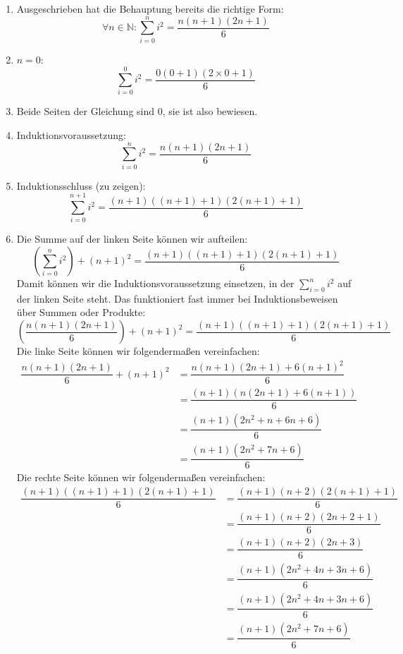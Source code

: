 \begin{enumerate}
\item Ausgeschrieben hat die Behauptung bereits die richtige Form:
\begin{displaymath}
  \forall n\in\mathbb{N}: \sum_{i=0}^n i^2 = \dfrac{n(n+1)(2n+1)}{6}
\end{displaymath}
\item $n=0$:
\begin{displaymath}
  \sum_{i=0}^0 i^2 = \dfrac{0(0+1)(2\times 0 + 1)}{6}
\end{displaymath}
\item Beide Seiten der Gleichung sind $0$, sie ist also bewiesen.
\item Induktionsvoraussetzung:
%
\begin{displaymath}
  \sum_{i=0}^n i^2 = \dfrac{n(n+1)(2n+1)}{6}
\end{displaymath}
\item Induktionsschluss (zu zeigen):
\begin{displaymath}
  \sum_{i=0}^{n+1} i^2 = \dfrac{(n+1)((n+1)+1)(2(n+1)+1)}{6}
\end{displaymath}
\item Die Summe auf der linken Seite können wir aufteilen:
%
\begin{displaymath}
  (\sum_{i=0}^{n} i^2) + (n+1)^2  = \dfrac{(n+1)((n+1)+1)(2(n+1)+1)}{6}
\end{displaymath}
%
Damit können wir die Induktionsvoraussetzung einsetzen, in der
$\sum_{i=0}^{n} i^2$ auf der linken Seite steht.  Das
funktioniert fast immer bei Induktionsbeweisen über
Summen oder Produkte:
%
\begin{displaymath}
  (\dfrac{n(n+1)(2n+1)}{6}) + (n+1)^2  =
  \dfrac{(n+1)((n+1)+1)(2(n+1)+1)}{6}
\end{displaymath}
%
Die linke Seite können wir folgendermaßen vereinfachen:
%
\begin{displaymath}
\begin{split}
  \dfrac{n(n+1)(2n+1)}{6} + (n+1)^2  &=
  \dfrac{n(n+1)(2n+1) + 6(n+1)^2}{6} \\ &=
  \dfrac{(n+1)(n(2n+1) + 6(n+1))}{6} \\ &=
  \dfrac{(n+1)(2n^2+n + 6n+6)}{6} \\ &=
  \dfrac{(n+1)(2n^2+  7n+6)}{6}
\end{split}
\end{displaymath}
%
Die rechte Seite können wir folgendermaßen vereinfachen:
%
\begin{displaymath}
  \begin{split}
  \dfrac{(n+1)((n+1)+1)(2(n+1)+1)}{6} &=
  \dfrac{(n+1)(n+2)(2(n+1)+1)}{6} \\ &=
  \dfrac{(n+1)(n+2)(2n+2+1)}{6} \\ &=
  \dfrac{(n+1)(n+2)(2n+3)}{6} \\ &=
  \dfrac{(n+1)(2n^2 + 4n + 3n + 6)}{6} \\ &=
  \dfrac{(n+1)(2n^2 + 4n + 3n + 6)}{6} \\ &=
  \dfrac{(n+1)(2n^2 + 7n + 6)}{6}
\end{split}
\end{displaymath}
\end{enumerate}
